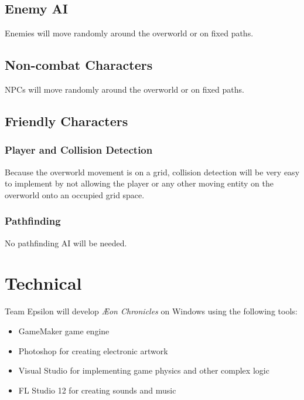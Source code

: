\documentclass[12pt,titlepage]{article}
\newcommand\gametitle{\textit{\AE on Chronicles}\xspace}
\begin{document}
\subsection{Enemy AI}

Enemies will move randomly around the overworld or on fixed paths.

\subsection{Non-combat Characters}

NPCs will move randomly around the overworld or on fixed paths.

\subsection{Friendly Characters}

\subsubsection{Player and Collision Detection}

Because the overworld movement is on a grid, collision detection will be very
easy to implement by not allowing the player or any other moving entity on the
overworld onto an occupied grid space.

\subsubsection{Pathfinding}

No pathfinding AI will be needed.

\newpage
\section{Technical}
%

Team Epsilon will develop \gametitle on Windows using the following tools:

\begin{itemize}
    \item GameMaker game engine
    \item Photoshop for creating electronic artwork
    \item Visual Studio for implementing game physics and other complex logic
    \item FL Studio 12 for creating sounds and music
\end{itemize}
\end{document}
